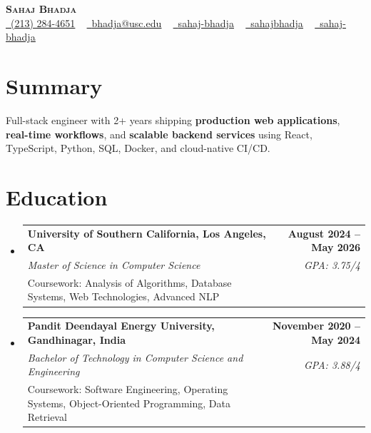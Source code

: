\documentclass[letterpaper,10pt]{article}
\makeatletter
\newcommand{\resumeEduSubheading}[5]{\vspace{-1pt}\item\begin{tabular*}{1.0\textwidth}[t]{l@{\extracolsep{\fill}}r}\textbf{#1} & \textbf{\small #2} \\\textit{\small #3} & \textit{\small #4} \\\small #5 & \\\end{tabular*}\vspace{-2pt}}
\newcommand{\resumeSubHeadingListStart}{\begin{itemize}[leftmargin=0.0in, label={}]}
\newcommand{\resumeSubHeadingListEnd}{\end{itemize}}
\makeatother
\begin{document}
\begin{center}
{\Huge \scshape \textbf{Sahaj Bhadja}} \\ \vspace{1pt}
\small \href{tel:(213) 284-4651}{\faPhone\ \underline{(213) 284-4651}} ~ \href{mailto: bhadja@usc.edu}{\raisebox{-0.2\height}\faEnvelope\ \underline{bhadja@usc.edu}} ~
\href{https://www.linkedin.com/in/sahaj-bhadja/}{\raisebox{-0.2\height}\faLinkedin\ \underline{sahaj-bhadja}} ~ \href{https://github.com/SAHAJ-BHADJA}{\raisebox{-0.2\height}\faGithub\ \underline{sahajbhadja}} ~
\href{https://sahaj-bhadja.vercel.app/}{\raisebox{-0.2\height}\faGlobe\ \underline{sahaj-bhadja}}
\end{center}
\vspace{-20pt}
\section{Summary}
\begin{itemize}[leftmargin=0.15in, label={}]
\small{\item{Full-stack engineer with 2+ years shipping \textbf{production web applications}, \textbf{real-time workflows}, and \textbf{scalable backend services} using React, TypeScript, Python, SQL, Docker, and cloud-native CI/CD.}}
\end{itemize}
\vspace{-18pt}
\section{Education}
\resumeSubHeadingListStart
\resumeEduSubheading{University of Southern California, Los Angeles, CA}{August 2024 -- May 2026}{Master of Science in Computer Science}{GPA: 3.75/4}{Coursework: Analysis of Algorithms, Database Systems, Web Technologies, Advanced NLP}
\vspace{-9pt}
\resumeEduSubheading{Pandit Deendayal Energy University, Gandhinagar, India}{November 2020 -- May 2024}{Bachelor of Technology in Computer Science and Engineering}{GPA: 3.88/4}{Coursework: Software Engineering, Operating Systems, Object-Oriented Programming, Data Retrieval}
\resumeSubHeadingListEnd
\vspace{-20pt}
\end{document}
